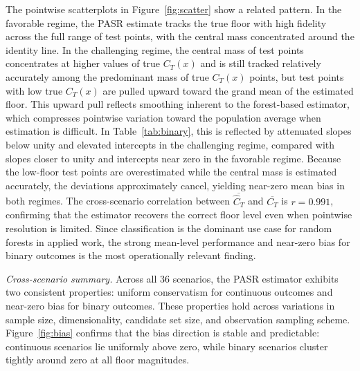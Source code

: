 \documentclass[11pt]{article}
\theoremstyle{plain}
\theoremstyle{definition}
\theoremstyle{remark}
\begin{document}
The pointwise scatterplots in Figure~\ref{fig:scatter} show a related pattern. In the favorable regime, the PASR estimate tracks the true floor with high fidelity across the full range of test points, with the central mass concentrated around the identity line. In the challenging regime, the central mass of test points concentrates at higher values of true $C_T(x)$ and is still tracked relatively accurately among the predominant mass of true $C_T(x)$ points, but test points with low true $C_T(x)$ are pulled upward toward the grand mean of the estimated floor. This upward pull reflects smoothing inherent to the forest-based estimator, which compresses pointwise variation toward the population average when estimation is difficult. In Table~\ref{tab:binary}, this is reflected by attenuated slopes below unity and elevated intercepts in the challenging regime, compared with slopes closer to unity and intercepts near zero in the favorable regime. Because the low-floor test points are overestimated while the central mass is estimated accurately, the deviations approximately cancel, yielding near-zero mean bias in both regimes. The cross-scenario correlation between $\overline{\widehat C_T}$ and $\overline{C_T}$ is $r = 0.991$, confirming that the estimator recovers the correct floor level even when pointwise resolution is limited. Since classification is the dominant use case for random forests in applied work, the strong mean-level performance and near-zero bias for binary outcomes is the most operationally relevant finding.

\medskip
\noindent\textit{Cross-scenario summary.}\quad
Across all 36 scenarios, the PASR estimator exhibits two consistent properties: uniform conservatism for continuous outcomes and near-zero bias for binary outcomes. These properties hold across variations in sample size, dimensionality, candidate set size, and observation sampling scheme. Figure~\ref{fig:bias} confirms that the bias direction is stable and predictable: continuous scenarios lie uniformly above zero, while binary scenarios cluster tightly around zero at all floor magnitudes.
\end{document}
